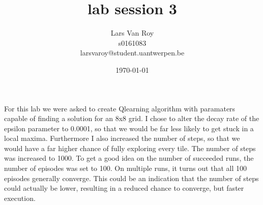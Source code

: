 \documentclass{article}%
\title{lab session 3}
\date{\today}
\author{Lars Van Roy\\s0161083\\larsvaroy@student.uantwerpen.be}
\begin{document}
	\maketitle
	For this lab we were asked to create Qlearning algorithm with paramaters capable of finding a solution for an 8x8 grid. I chose to alter the decay rate of the epsilon parameter to 0.0001, so that we would be far less likely to get stuck in a local maxima. Furthermore I also increased the number of steps, so that we would have a far higher chance of fully exploring every tile. The number of steps was increased to 1000. To get a good idea on the number of succeeded runs, the number of episodes was set to 100. On multiple runs, it turns out that all 100 episodes generally converge. This could be an indication that the number of steps could actually be lower, resulting in a reduced chance to converge, but faster execution.
\end{document}
